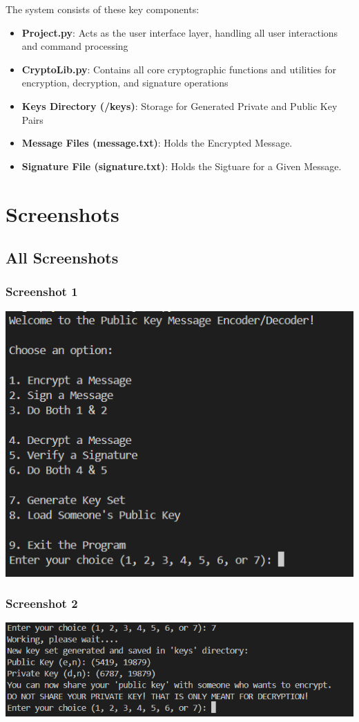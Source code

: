 \documentclass[12pt,a4paper]{report}
\begin{document}
The system consists of these key components:
\begin{itemize}
    \item \textbf{Project.py}: Acts as the user interface layer, handling all user interactions and command processing
    \item \textbf{CryptoLib.py}: Contains all core cryptographic functions and utilities for encryption, decryption, and signature operations
    \item \textbf{Keys Directory (/keys)}: Storage for Generated Private and Public Key Pairs
    \item \textbf{Message Files (message.txt)}: Holds the Encrypted Message.
     \item \textbf{Signature File (signature.txt)}: Holds the Sigtuare for a Given Message.
\end{itemize}

\chapter{Screenshots}
\section{All Screenshots}
\subsection{Screenshot 1}
\includegraphics[width=1\textwidth]{screenshot-1.png}
\subsection{Screenshot 2}
\includegraphics[width=1\textwidth]{screenshot-5.png}
\end{document}
